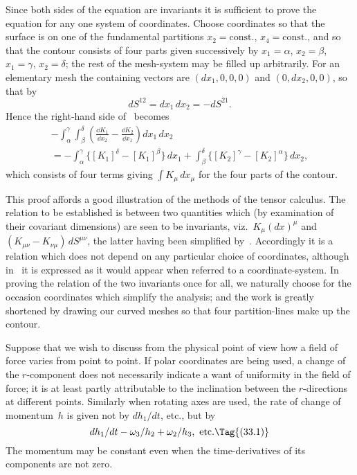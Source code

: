\documentclass[12pt]{book}
\begin{document}
Since both sides of the equation are invariants it is sufficient to prove the
equation for any one system of coordinates. Choose coordinates so that the
surface is on one of the fundamental partitions $x_{2} = \text{const.}$, $x_{4} = \text{const.}$, and so
that the contour consists of four parts given successively by $x_{1} = \alpha$, $x_{2} = \beta$,
$x_{1} = \gamma$, $x_{2} = \delta$; the rest of the mesh\hyp{}system may be filled up arbitrarily. For
an elementary mesh the containing vectors are $(dx_{1}, 0, 0, 0)$ and $(0, dx_{2} , 0, 0)$,
so that by~
\[
dS^{12} = dx_{1}\, dx_{2} = -dS^{21}.
\]
Hence the right-hand side of~ becomes
\begin{multline*}
  -\int_{\alpha}^{\gamma} \int_{\beta}^{\delta} \left(\frac{\dd K_{1}}{\dd x_{2}} - \frac{\dd K_{2}}{\dd x_{1}}\right) dx_{1}\, dx_{2} \\
  = -\int_{\alpha}^{\gamma} \bigl\{[K_{1}]^{\delta} - [K_{1}]^{\beta}\bigr\}\, dx_{1}
   + \int_{\beta}^{\delta} \bigl\{[K_{2}]^{\gamma} - [K_{2}]^{\alpha}\bigr\}\, dx_{2},
\end{multline*}
which consists of four terms giving $\int K_{\mu}\, dx_{\mu}$ for the four parts of the contour.

This proof affords a good illustration of the methods of the tensor calculus.
The relation to be established is between two quantities which (by examination
of their covariant dimensions) are seen to be invariants, viz.\ $K_{\mu} (dx)^{\mu}$ and
%
%
$(K_{\mu\nu} - K_{\nu\mu})\, dS^{\mu\nu}$, the latter having been simplified by~. Accordingly it
is a relation which does not depend on any particular choice of coordinates,
although in~ it is expressed as it would appear when referred to a
coordinate\hyp{}system. In proving the relation of the two invariants once for all,
we naturally choose for the occasion coordinates which simplify the analysis;
and the work is greatly shortened by drawing our curved meshes so that four
partition\hyp{}lines make up the contour.


Suppose that we wish to discuss from the physical point of view how a
field of force varies from point to point. If polar coordinates are being used,
a change of the $r$-component does not necessarily indicate a want of uniformity
in the field of force; it is at least partly attributable to the inclination between
the $r$-directions at different points. Similarly when rotating axes are used,
the rate of change of momentum~$h$ is given not by $dh_{1}/dt$, etc., but by
\[
dh_{1}/dt - \omega_{3}/h_{2} + \omega_{2}/h_{3}, \text{ etc.}
\Tag{(33.1)}
\]
The momentum may be constant even when the time\hyp{}derivatives of its components
are not zero.
\end{document}
